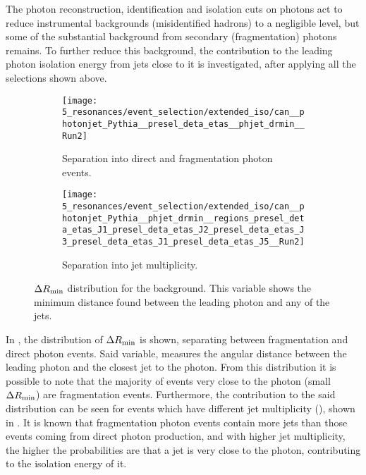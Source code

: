 The photon reconstruction, identification and isolation cuts on photons act to reduce instrumental backgrounds (misidentified hadrons) to a negligible level, but some of the substantial background from secondary (fragmentation) photons remains.
To further reduce this background, the contribution to the leading photon isolation energy from jets close to it is investigated, after applying all the selections shown above.

\begin{figure}[ht!]
    \centering
    \begin{subfigure}[t]{0.49\linewidth}
        \centering
        \texttt{[image: 5\_resonances/event\_selection/extended\_iso/can\_\_photonjet\_Pythia\_\_presel\_deta\_etas\_\_phjet\_drmin\_\_Run2]}
        \caption{Separation into direct and fragmentation photon events.}
        \label{fig:evt_selection:sr_opt:extended_iso:phjet_drmin:frag_direct}
    \end{subfigure}
    \hfill
    \begin{subfigure}[t]{0.49\linewidth}
        \centering
        \texttt{[image: 5\_resonances/event\_selection/extended\_iso/can\_\_photonjet\_Pythia\_\_phjet\_drmin\_\_regions\_presel\_deta\_etas\_J1\_presel\_deta\_etas\_J2\_presel\_deta\_etas\_J3\_presel\_deta\_etas\_J1\_presel\_deta\_etas\_J5\_\_Run2]}
        \caption{Separation into jet multiplicity.}
        \label{fig:evt_selection:sr_opt:extended_iso:phjet_drmin:njets}
    \end{subfigure}
    
    \caption{\(\Delta R_{\text{min}}\) distribution for the \gammajet \pythia background. This variable shows the minimum distance found between the leading photon and any of the jets.}
    \label{fig:evt_selection:sr_opt:extended_iso:phjet_drmin}
\end{figure}

In \Fig{\ref{fig:evt_selection:sr_opt:extended_iso:phjet_drmin:frag_direct}}, the distribution of \(\Delta R_{\text{min}}\) is shown, separating between fragmentation and direct photon events. Said variable, measures the angular distance between the leading photon and the closest jet to the photon. From this distribution it is possible to note that the majority of events very close to the photon (small \(\Delta R_{\text{min}}\)) are fragmentation events.
Furthermore, the contribution to the said distribution can be seen for events which have different jet multiplicity (\njet), shown in \Fig{\ref{fig:evt_selection:sr_opt:extended_iso:phjet_drmin:njets}}. It is known that fragmentation photon events contain more jets than those events coming from direct photon production, and with higher jet multiplicity, the higher the probabilities are that a jet is very close to the photon, contributing to the isolation energy of it.


